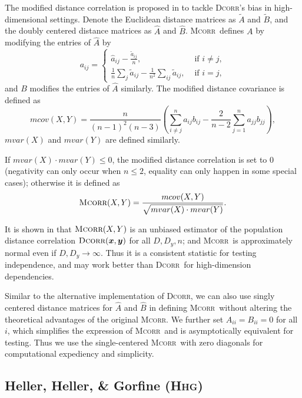 \documentclass[11pt]{article}
\providecommand{\sct}[1]{{\normalfont\textsc{#1}}}
\providecommand{\mb}[1]{\boldsymbol{#1}}
\newcommand{\Hhg}{\sct{Hhg}}
\newcommand{\Dcorr}{\sct{Dcorr}}
\newcommand{\Mcorr}{\sct{Mcorr}}
\begin{document}
The modified distance correlation is proposed in \cite{SzekelyRizzo2013a} to tackle   \Dcorr's bias in high-dimensional settings. Denote the Euclidean distance matrices as $\tilde{A}$ and $\tilde{B}$, and the doubly centered distance matrices as $\hat{A}$ and $\hat{B}$.  \Mcorr~defines $A$ by modifying the entries of $\hat{A}$ by
\[a_{ij} = \left\{
  \begin{array}{lr}
    \hat{a}_{ij}-\frac{\tilde{a}_{ij}}{n}, & \mbox{ if } i \neq j, \\
    \frac{1}{n}\sum_{j}\tilde{a}_{ij}-\frac{1}{n^2}\sum_{ij}\tilde{a}_{ij}, &\mbox{ if } i = j,
  \end{array}
\right.
\]
and  $B$ modifies the entries of $\hat{A}$ similarly.
The modified distance covariance is defined as
\begin{equation*}
mcov(X,Y)=\frac{n}{(n-1)^2(n-3)}\left(\sum_{i \neq j}^{n}a_{ij}b_{ij}-\frac{2}{n-2}\sum_{j=1}^{n}a_{jj}b_{jj}\right),
\end{equation*}
$mvar(X)$ and $mvar(Y)$ are defined similarly.

If $mvar(X) \cdot mvar(Y) \leq 0$, the modified distance correlation is set to $0$ (negativity can only occur when $n\leq 2$, equality can only happen in some special cases); otherwise it is defined as
\begin{equation*}
\Mcorr(X,Y)=\frac{mcov(X,Y)}{\sqrt{mvar(X) \cdot mvar(Y)}}.
\end{equation*}

It is shown in \cite{SzekelyRizzo2013a} that $\Mcorr(X,Y)$ is an unbiased estimator of the population distance correlation $\Dcorr(\mb{x},\mb{y})$ for all $D, D_y, n$; and \Mcorr~is approximately normal even if $D,D_y \rightarrow \infty$. Thus it is a consistent statistic for testing independence, and may work better than \Dcorr~for high-dimension dependencies.

Similar to the alternative implementation of \Dcorr, we can also use singly centered distance matrices for $\hat{A}$ and $\hat{B}$ in defining \Mcorr~without altering the theoretical advantages of the original \Mcorr. We further set $A_{ii}=B_{ii}=0$ for all $i$, which simplifies the expression of \Mcorr~and is asymptotically equivalent for testing. 
Thus we use the single-centered \Mcorr~with zero diagonals for computational expediency and simplicity.


\subsection{Heller, Heller, \& Gorfine (\Hhg)}
\label{appen:hhg}
\end{document}
